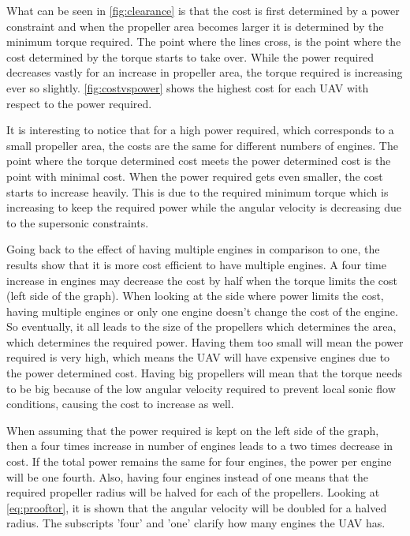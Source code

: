 What can be seen in \autoref{fig:clearance} is that the cost is first determined by a power constraint and when the propeller area becomes larger it is determined by the minimum torque required. The point where the lines cross, is the point where the cost determined by the torque starts to take over. While the power required decreases vastly for an increase in propeller area, the torque required is increasing ever so slightly. \autoref{fig:costvspower} shows the highest cost for each UAV with respect to the power required.


It is interesting to notice that for a high power required, which corresponds to a small propeller area, the costs are the same for different numbers of engines. The point where the torque determined cost meets the power determined cost is the point with minimal cost. When the power required gets even smaller, the cost starts to increase heavily. This is due to the required minimum torque which is increasing to keep the required power while the angular velocity is decreasing due to the supersonic constraints. 

Going back to the effect of having multiple engines in comparison to one, the results show that it is more cost efficient to have multiple engines. A four time increase in engines may decrease the cost by half when the torque limits the cost (left side of the graph). When looking at the side where power limits the cost, having multiple engines or only one engine doesn't change the cost of the engine. So eventually, it all leads to the size of the propellers which determines the area, which determines the required power. Having them too small will mean the power required is very high, which means the UAV will have expensive engines due to the power determined cost. Having big propellers will mean that the torque needs to be big because of the low angular velocity required to prevent local sonic flow conditions, causing the cost to increase as well. 

When assuming that the power required is kept on the left side of the graph, then a four times increase in number of engines leads to a two times decrease in cost. If the total power remains the same for four engines, the power per engine will be one fourth. Also, having four engines instead of one means that the required propeller radius will be halved for each of the propellers. Looking at \autoref{eq:prooftor}, it is shown that the angular velocity will be doubled for a halved radius. The subscripts 'four' and 'one' clarify how many engines the UAV has.


